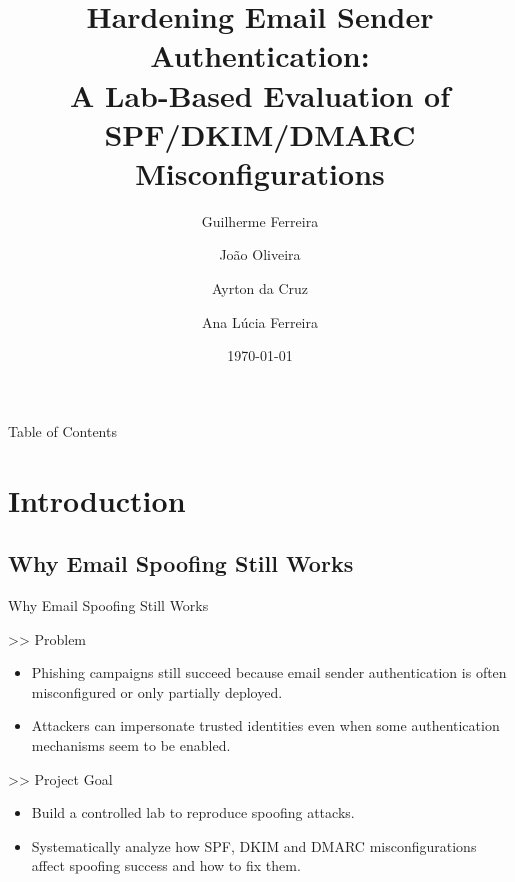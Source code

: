 \documentclass[aspectratio=169,10pt]{beamer}
\title[Hardening Email Sender Authentication]{Hardening Email Sender Authentication: \\ A Lab-Based Evaluation of SPF/DKIM/DMARC Misconfigurations}
\author[Guilherme, Jo\~ao, Ayrton, Ana]{Guilherme Ferreira \and Jo\~ao Oliveira \and Ayrton da Cruz \and Ana L\'ucia Ferreira}
\institute[FEUP]{Faculdade de Engenharia -- Universidade do Porto}
\date{\today}
\begin{document}
\begin{frame}[plain]
  \titlepage
\end{frame}

\begin{frame}{Table of Contents}
  \transdissolve
  \tableofcontents
\end{frame}

\section{Introduction}
\subsection{Why Email Spoofing Still Works}
\begin{frame}{Why Email Spoofing Still Works}
  \transdissolve
  \begin{block}{>> Problem}
      \begin{itemize}
        \item Phishing campaigns still succeed because email sender authentication is often misconfigured or only partially deployed.
        \item Attackers can impersonate trusted identities even when some authentication mechanisms seem to be enabled.
      \end{itemize} 
      \vspace{10pt}
   \end{block}
   \vfill
   \begin{block}{>> Project Goal}
      \begin{itemize}
        \item Build a controlled lab to reproduce spoofing attacks.
        \item Systematically analyze how SPF, DKIM and DMARC misconfigurations affect spoofing success and how to fix them.
      \end{itemize}
      \vspace{10pt}
    \end{block}
\end{frame}
\end{document}
